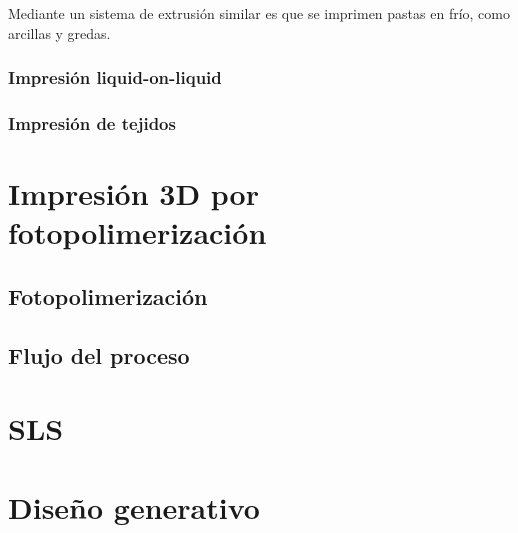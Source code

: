 Mediante un sistema de extrusión similar es que se imprimen pastas en frío, como arcillas y gredas.

\subsubsection{Impresión liquid-on-liquid}

\subsubsection{Impresión de tejidos}
 
\section{Impresión 3D por fotopolimerización}

\subsection{Fotopolimerización}

\subsection{Flujo del proceso}

\section{SLS}

\section{Diseño generativo}